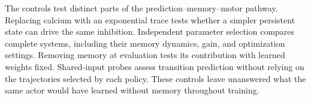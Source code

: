 The controls test distinct parts of the prediction--memory--motor pathway. Replacing calcium with an exponential trace tests whether a simpler persistent state can drive the same inhibition. Independent parameter selection compares complete systems, including their memory dynamics, gain, and optimization settings. Removing memory at evaluation tests its contribution with learned weights fixed. Shared-input probes assess transition prediction without relying on the trajectories selected by each policy. These controls leave unanswered what the same actor would have learned without memory throughout training.
